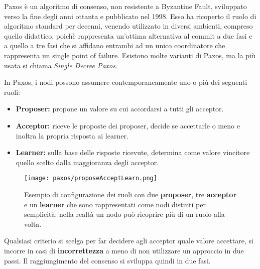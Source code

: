 Paxos è un algoritmo di consenso, non resistente a Byzantine Fault, sviluppato verso la fine degli anni ottanta e pubblicato nel 1998. Esso ha ricoperto il ruolo di algoritmo standard per decenni, venendo utilizzato in diversi ambienti, compreso quello didattico, poichè rappresenta un'ottima alternativa al commit a due fasi e a quello a tre fasi che si affidano entrambi ad un unico coordinatore che rappresenta un single point of failure. Esistono molte varianti di Paxos, ma la più usata si chiama \textit{Single Decree Paxos}.

In Paxos, i nodi possono assumere contemporaneamente uno o più dei seguenti ruoli:
\begin{itemize}
	\item \textbf{Proposer:} propone un valore su cui accordarsi a tutti gli acceptor.
	\item \textbf{Acceptor:} riceve le proposte dei proposer, decide se accettarle o meno e inoltra la propria risposta ai learner.
	\item \textbf{Learner:} sulla base delle risposte ricevute, determina come valore vincitore quello scelto dalla maggioranza degli acceptor.
\end{itemize}


  \begin{figure}[H]
    \centering
    \texttt{[image: paxos/proposeAcceptLearn.png]}
    \caption{Esempio di configurazione dei ruoli con due \textbf{proposer}, tre \textbf{acceptor} e un \textbf{learner} che sono rappresentati come nodi distinti per semplicità: nella realtà un nodo può ricoprire più di un ruolo alla volta.}
    \label{fig:figure 5}
  \end{figure}


Qualsiasi criterio si scelga per far decidere agli acceptor quale valore accettare, si incorre in casi di \textbf{incorrettezza} a meno di non utilizzare un approccio in due passi. 
Il raggiungimento del consenso si sviluppa quindi in due fasi.

